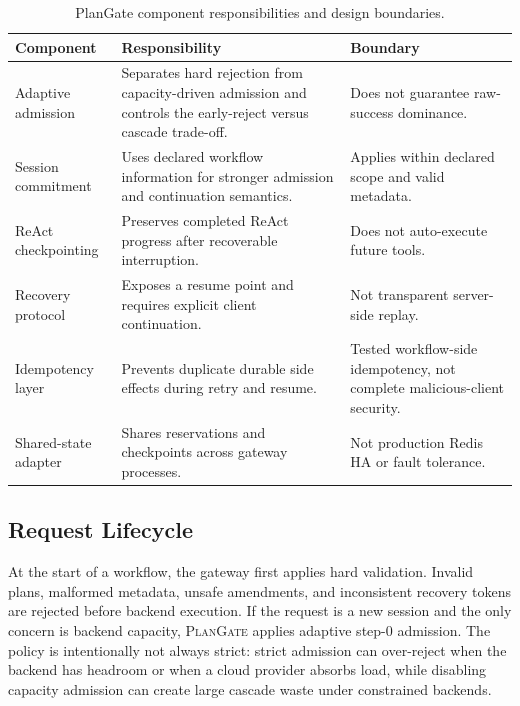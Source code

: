\documentclass[5p,times]{elsarticle}
\newcommand{\plangate}{\textsc{PlanGate}\xspace}
\begin{document}
\begin{table}[t]
\centering
\caption{PlanGate component responsibilities and design boundaries.}
\label{tab:overview_components}
\footnotesize
\begin{tabular}{@{}>{\raggedright\arraybackslash}p{}>{\raggedright\arraybackslash}p{}>{\raggedright\arraybackslash}p{}@{}}
\toprule
\textbf{Component} & \textbf{Responsibility} & \textbf{Boundary} \\
\midrule
Adaptive admission & Separates hard rejection from capacity-driven admission and controls the early-reject versus cascade trade-off. & Does not guarantee raw-success dominance. \\
Session commitment & Uses declared workflow information for stronger admission and continuation semantics. & Applies within declared scope and valid metadata. \\
ReAct checkpointing & Preserves completed ReAct progress after recoverable interruption. & Does not auto-execute future tools. \\
Recovery protocol & Exposes a resume point and requires explicit client continuation. & Not transparent server-side replay. \\
Idempotency layer & Prevents duplicate durable side effects during retry and resume. & Tested workflow-side idempotency, not complete malicious-client security. \\
Shared-state adapter & Shares reservations and checkpoints across gateway processes. & Not production Redis HA or fault tolerance. \\
\bottomrule
\end{tabular}
\end{table}

\subsection{Request Lifecycle}

At the start of a workflow, the gateway first applies hard validation. Invalid plans, malformed metadata, unsafe amendments, and inconsistent recovery tokens are rejected before backend execution. If the request is a new session and the only concern is backend capacity, \plangate applies adaptive step-0 admission. The policy is intentionally not always strict: strict admission can over-reject when the backend has headroom or when a cloud provider absorbs load, while disabling capacity admission can create large cascade waste under constrained backends.
\end{document}

